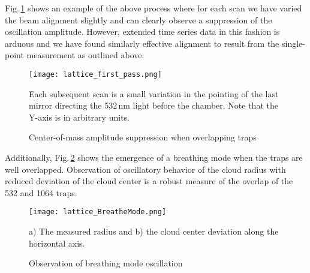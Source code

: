 Fig.\,\ref{fig:latFirtPass} shows an example of the above process where for each scan we have varied the beam alignment slightly and can clearly observe a suppression of the oscillation amplitude.
However, extended time series data in this fashion is arduous and we have found similarly effective alignment to result from the single-point measurement as outlined above.
	\begin{figure} 
		\centerline{
		\texttt{[image: lattice\_first\_pass.png]}}
		\caption{Center-of-mass amplitude suppression when overlapping traps}{Each subsequent scan is a small variation in the pointing of the last mirror directing the 532\,nm light before the chamber. Note that the Y-axis is in arbitrary units.}
		\label{fig:latFirtPass}
	\end{figure}
	
Additionally, Fig.\,\ref{fig:latBreatheMode} shows the emergence of a breathing mode when the traps are well overlapped.
Observation of oscillatory behavior of the cloud radius with reduced deviation of the cloud center is a robust measure of the overlap of the 532 and 1064 traps.
	\begin{figure} 
		\centerline{
		\texttt{[image: lattice\_BreatheMode.png]}}
		\caption{Observation of breathing mode oscillation}{a) The measured radius and b) the cloud center deviation along the horizontal axis.}
		\label{fig:latBreatheMode}
	\end{figure}
	


